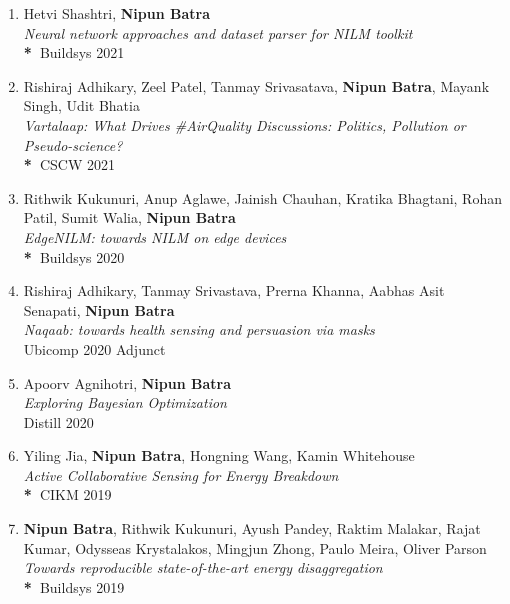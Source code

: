 \documentclass[letter,10pt]{article}
\begin{document}
\begin{itemize}
\begin{enumerate}
   

    \item{Hetvi Shashtri, \textbf{Nipun Batra}}\\
    \textit{Neural network approaches and dataset parser for NILM toolkit}\\
    \textbf{*~}{Buildsys 2021}

    
    
    \item{Rishiraj Adhikary, Zeel Patel, Tanmay Srivasatava, \textbf{Nipun Batra}, Mayank Singh, Udit Bhatia}\\
    \textit{Vartalaap: What Drives \#AirQuality Discussions: Politics, Pollution or Pseudo-science?}\\
    \textbf{*~}{CSCW 2021}
    
    \item{Rithwik Kukunuri, Anup Aglawe, Jainish Chauhan, Kratika Bhagtani, Rohan Patil, Sumit Walia, \textbf{Nipun Batra}}\\
    \textit{EdgeNILM: towards NILM on edge devices}\\
    \textbf{*~}{Buildsys 2020}
    
    \item{Rishiraj Adhikary, Tanmay Srivastava, Prerna Khanna, Aabhas Asit Senapati, \textbf{Nipun Batra}}\\
    \textit{Naqaab: towards health sensing and persuasion via masks}\\
    {Ubicomp 2020 Adjunct}
    
    \item{Apoorv Agnihotri, \textbf{Nipun Batra}}\\
    \textit{Exploring Bayesian Optimization}\\
    \textbf{}{Distill 2020}

    \item{Yiling Jia, \textbf{Nipun Batra}, Hongning Wang, Kamin Whitehouse}\\
    \textit{Active Collaborative Sensing for Energy Breakdown}\\
    \textbf{*~}{CIKM 2019}
     
    \item{\textbf{Nipun Batra}, Rithwik Kukunuri, Ayush Pandey, Raktim Malakar, Rajat Kumar, Odysseas Krystalakos, Mingjun Zhong, Paulo Meira, Oliver Parson}\\
    \textit{Towards reproducible state-of-the-art energy disaggregation}\\
    \textbf{*~}{Buildsys 2019}
     

\end{enumerate}
\end{itemize}
\end{document}
